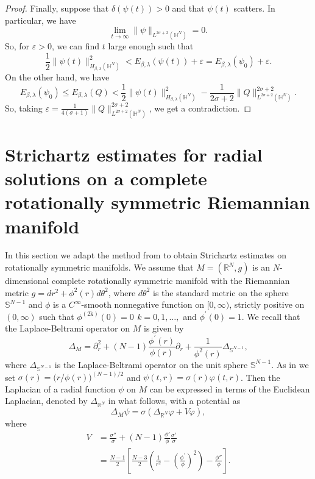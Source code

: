 \documentclass[10pt,leqno]{amsart}
\numberwithin{equation}{section}
\newcommand{\field}[1]{\mathbb{#1}}
\newcommand{\R}{\field{R}}          		%
\newcommand{\Sph}{\field{S}}        		%
\newcommand{\Hy}{\field{H}}
\begin{document}
\begin{proof}
Finally, suppose that $\delta (\psi(t))>0$ and that $\psi(t)$ scatters. In particular, we have
$$\lim_{t\rightarrow \infty} \|\psi\|_{L^{2\sigma +2}(\Hy^N)}=0.$$ 
So, for $\varepsilon>0$, we can find $t$ large enough such that
$$ \frac{1}{2} \|\psi(t)\|_{H_{\beta,\lambda} (\Hy^N)}^2 < E_{\beta,\lambda} (\psi (t)) +\varepsilon = E_{\beta,\lambda} (\psi_0) +\varepsilon. $$
On the other hand, we have
$$E_{\beta,\lambda}(\psi_0)\leq E_{\beta,\lambda}(Q) < \frac{1}{2} \|\psi (t)\|_{H_{\beta,\lambda} (\Hy^N)}^2 -\frac{1}{2\sigma +2} \|Q\|_{L^{2\sigma +2}(\Hy^N)}^{2\sigma +2}.$$
So, taking $\varepsilon=\frac{1}{4(\sigma +1)} \|Q\|_{L^{2\sigma +2}(\Hy^N)}^{2\sigma +2} $, we get a contradiction.
\end{proof}


\section{Strichartz estimates for radial solutions on a complete rotationally symmetric Riemannian manifold}
\label{secstri2}
In this section we adapt the method from \cite{BaDyweight} to obtain Strichartz estimates on rotationally symmetric manifolds. We assume that $M=(\R^N,g)$ is an $N$-dimensional complete rotationally symmetric %
manifold with the Riemannian metric 
$g=dr^2 + \phi^2(r)d\theta^2$, where $d\theta^2$ is the standard metric on the sphere $\Sph^{N-1}$ and 
$\phi$ is a $C^\infty$-smooth nonnegative function on $[0,\infty)$, strictly positive on $(0,\infty)$ such that 
$\phi^{(\text{2k})}(0)=0\,\ k=0,1,\ldots,$ and $\phi^\prime(0)=1$.
We recall that the Laplace-Beltrami operator on $M$ is  given by
\[
\Delta_{M}=\partial_r^2 +(N-1)\frac{\phi^\prime (r)}{\phi(r)}\partial_r
+\frac{1}{\phi^2(r)}\Delta_{\Sph^{N-1}},
\]
where $\Delta_{\Sph^{N-1}}$ is the Laplace-Beltrami operator on the unit sphere $\Sph^{N-1}$.
As in \cite[\S 2.1]{BaDyweight} we set $\sigma(r)=\big(r/\phi(r)\big)^{(N-1)/2}$ and 
$\psi(t,r)=\sigma (r)\varphi(t,r)$. Then the Laplacian of a radial function $\psi$ on $M$ can be expressed in terms of the Euclidean Laplacian, denoted by $\Delta_{\R^N}$ in what follows, with a potential as 
$$\Delta_M \psi = \sigma (\Delta_{\R^N} \varphi +V\varphi ),$$
where 
\begin{align*}
V &=\frac{\sigma''}{\sigma}+(N-1)\frac{\phi'}{\phi}\frac{\sigma'}{\sigma}\\
&=\frac{N-1}{2}\left[\frac{N-3}{2}\left(\frac{1}{r^2}
-\left(\frac{\phi^\prime}{\phi}\right)^2\right)
-\frac{\phi''}{\phi}\right].
\end{align*}
\end{document}
